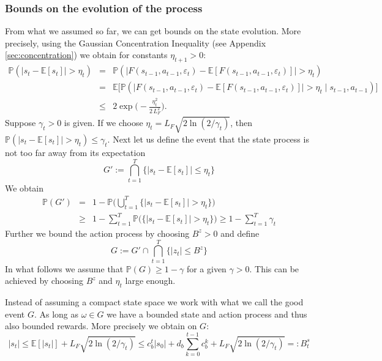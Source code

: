 \documentclass[reqno, 11pt]{amsart}%
\newcommand\EE{\mathbb E}
\newcommand\PP{\mathbb P}
\theoremstyle{definition}
\begin{document}
\subsubsection{Bounds on the evolution of the process}
From what we assumed so far, we can get bounds on the state evolution. More precisely, using the Gaussian Concentration Inequality (see Appendix \ref{sec:concentration}) we obtain for constants $\eta_{t+1}>0:$
\begin{eqnarray*}
   \PP (|s_{t}-\EE[s_{t}]| > \eta_{t})  &=&  \PP (|F(s_{t-1},a_{t-1},\varepsilon_{t})-\EE[F(s_{t-1},a_{t-1},\varepsilon_{t})]| > \eta_{t})\\
   &=&  \EE\Big[  \PP (|F(s_{t-1},a_{t-1},\varepsilon_{t})-\EE[F(s_{t-1},a_{t-1},\varepsilon_{t})]| > \eta_{t}\; |\; s_{t-1},a_{t-1}) \Big]\\
   &\le & 2 \exp\!\Big(-\frac{\eta_{t}^2}{2\,L_F^2}\Big).
\end{eqnarray*}
Suppose $\gamma_{t}>0$ is given. If we choose $\eta_t = L_F \sqrt{ 2 \ln(2/\gamma_t)}$, then $ \PP (|s_{t}-\EE[s_{t}]| > \eta_{t})\le \gamma_t.$
Next let us define the event that the state process is not too far away from its expectation
\begin{equation}\label{eq:goodevent}
    G' := \bigcap_{t=1}^T \Big\{|s_t-\EE[s_t]| \le  \eta_t \Big\}
\end{equation} 
We obtain
\begin{eqnarray*}
    \PP(G') &=& 1- \PP\Big( \bigcup_{t=1}^T \{|s_t-\EE[s_t]| >  \eta_t \}\Big) \\
    &\ge& 1- \sum_{t=1}^T \PP\big(  \{|s_t-\EE[s_t]| >  \eta_t \}\big) \ge 1- \sum_{t=1}^T  \gamma_t%
\end{eqnarray*}
Further we bound the action process by choosing $B^z>0$ and define
$$ G:= G' \cap \bigcap_{t=1}^T \Big\{|z_t| \le  B^z \Big\}$$
In what follows we assume that $\PP(G)\ge 1-\gamma $ for a given $\gamma>0$. This can be achieved by choosing $B^z$ and $\eta_t$ large enough.

 Instead of assuming a compact state  space we work with what we call the good event $G$. As long as $\omega\in G$ we have a bounded state and action process  and thus also bounded rewards. More precisely we obtain on $G$:
 \begin{equation}\label{eq:s_bound}
     |s_t| \le \EE[|s_t|] + L_F \sqrt{ 2 \ln(2/\gamma_t)}\le c_b^t |s_0|+ d_b \sum_{k=0}^{t-1}c_b^k+ L_F \sqrt{ 2 \ln(2/\gamma_t)} =: B_t^s
 \end{equation} 
\end{document}
